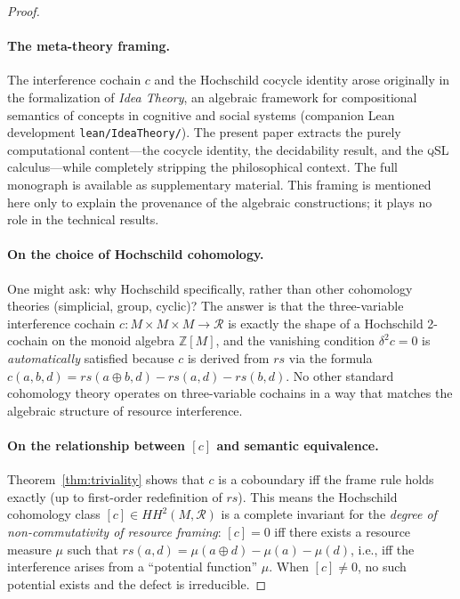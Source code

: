 \documentclass[acmsmall,sigplan,anonymous,review,screen]{acmart}
\theoremstyle{plain}
\theoremstyle{definition}
\newcommand{\qSL}{\textsc{qSL}\xspace}
\newcommand{\rs}{\mathit{rs}}
\newcommand{\HH}[2]{H\!H^{#1}(#2)}
\newcommand{\lean}[1]{\texttt{#1}}
\begin{document}
\begin{proof}
\paragraph{The meta-theory framing.}
The interference cochain $c$ and the Hochschild cocycle identity arose
originally in the formalization of \emph{Idea Theory}, an algebraic
framework for compositional semantics of concepts in cognitive and social
systems (companion Lean development \lean{lean/IdeaTheory/}).  The present
paper extracts the purely computational content---the cocycle identity,
the decidability result, and the \qSL calculus---while completely
stripping the philosophical context.  The full monograph is available as
supplementary material.  This framing is mentioned here only to explain
the provenance of the algebraic constructions; it plays no role in the
technical results.

\paragraph{On the choice of Hochschild cohomology.}
One might ask: why Hochschild specifically, rather than other cohomology
theories (simplicial, group, cyclic)?  The answer is that the three-variable
interference cochain $c : M \times M \times M \to \mathcal{R}$ is exactly
the shape of a Hochschild 2-cochain on the monoid algebra $\mathbb{Z}[M]$,
and the vanishing condition $\delta^2 c = 0$ is \emph{automatically}
satisfied because $c$ is derived from $\rs$ via the formula
$c(a,b,d) = \rs(a \oplus b, d) - \rs(a,d) - \rs(b,d)$.
No other standard cohomology theory operates on three-variable cochains
in a way that matches the algebraic structure of resource interference.

\paragraph{On the relationship between $[c]$ and semantic equivalence.}
Theorem~\ref{thm:triviality} shows that $c$ is a coboundary iff the
frame rule holds exactly (up to first-order redefinition of $\rs$).
This means the Hochschild cohomology class $[c] \in \HH{2}{M, \mathcal{R}}$
is a complete invariant for the \emph{degree of non-commutativity of
resource framing}: $[c] = 0$ iff there exists a resource measure $\mu$
such that $\rs(a,d) = \mu(a \oplus d) - \mu(a) - \mu(d)$, i.e., iff the
interference arises from a ``potential function'' $\mu$.  When $[c] \neq 0$,
no such potential exists and the defect is irreducible.


\end{proof}
\end{document}
